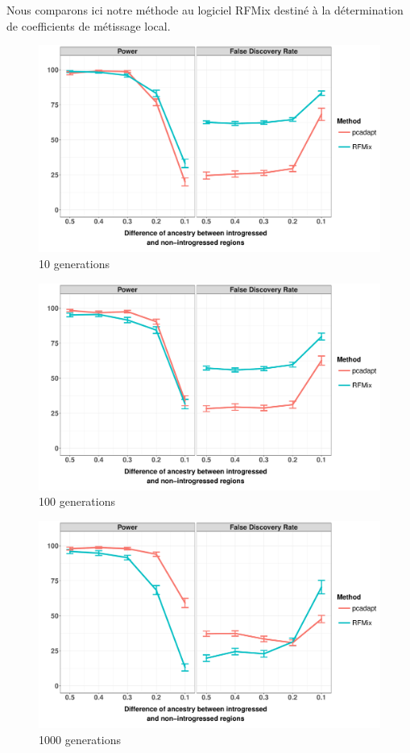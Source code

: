 \documentclass[12pt,twoside]{reedthesis}
\begin{document}
  Nous comparons ici notre méthode au logiciel RFMix destiné à la
  détermination de coefficients de métissage local.
  
  \begin{figure}
  \includegraphics[width=500px]{figure/facet_admixture_setting_10_gen} \caption{10 generations}\label{fig:ras10g}
  \end{figure}
  
  \begin{figure}
  \includegraphics[width=500px]{figure/facet_admixture_setting_100_gen} \caption{100 generations}\label{fig:ras100g}
  \end{figure}
  
  \begin{figure}
  \includegraphics[width=500px]{figure/facet_admixture_setting_1000_gen} \caption{1000 generations}\label{fig:ras1000g}
  \end{figure}
  
\end{document}

